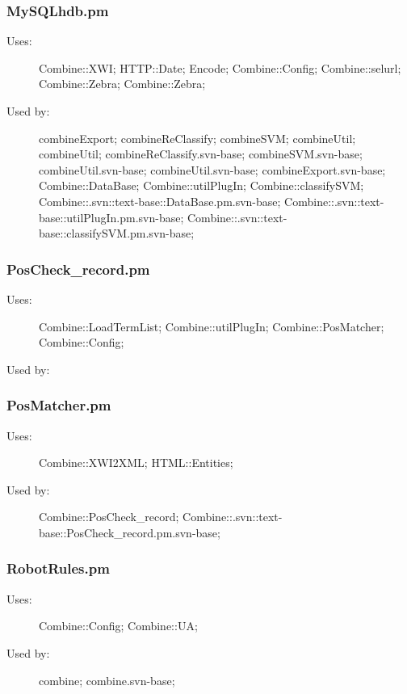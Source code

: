 \subsubsection{MySQLhdb.pm}
\begin{description}
\item[Uses:] Combine::XWI; HTTP::Date; Encode; Combine::Config; Combine::selurl; Combine::Zebra; Combine::Zebra; 

\item[Used by:] combineExport; combineReClassify; combineSVM; combineUtil; combineUtil; combineReClassify.svn-base; combineSVM.svn-base; combineUtil.svn-base; combineUtil.svn-base; combineExport.svn-base; Combine::DataBase; Combine::utilPlugIn; Combine::classifySVM; Combine::.svn::text-base::DataBase.pm.svn-base; Combine::.svn::text-base::utilPlugIn.pm.svn-base; Combine::.svn::text-base::classifySVM.pm.svn-base; 

\end{description}
\subsubsection{PosCheck\_record.pm}
\begin{description}
\item[Uses:] Combine::LoadTermList; Combine::utilPlugIn; Combine::PosMatcher; Combine::Config; 

\item[Used by:] 

\end{description}
\subsubsection{PosMatcher.pm}
\begin{description}
\item[Uses:] Combine::XWI2XML; HTML::Entities; 

\item[Used by:] Combine::PosCheck\_record; Combine::.svn::text-base::PosCheck\_record.pm.svn-base; 

\end{description}
\subsubsection{RobotRules.pm}
\begin{description}
\item[Uses:] Combine::Config; Combine::UA; 

\item[Used by:] combine; combine.svn-base; 

\end{description}
